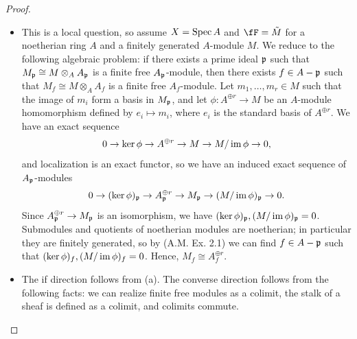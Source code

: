 \documentclass[a4paper]{article}
\begin{document}
\begin{enumerate} [label=\textbf{\arabic*.}, leftmargin=0em]
\begin{proof} $ $ \vspace{0pt}
    \begin{itemize}[leftmargin=0em]
        \item[(a)] This is a local question, so assume $X = \operatorname{Spec}{A}$ and $\fF = \tilde{M}$ for a noetherian ring $A$ and a finitely generated $A$-module $M$. We reduce to the following algebraic problem: if there exists a prime ideal $\mathfrak{p}$ such that $M_{\mathfrak{p}} \cong M \otimes_A A_{\mathfrak{p}}$ is a finite free $A_{\mathfrak{p}}$-module, then there exists $f \in A - \mathfrak{p}$ such that $M_{f} \cong M \otimes_A A_f$ is a finite free $A_f$-module. Let $m_1, \dots, m_r \in M$ such that the image of $m_i$ form a basis in $M_{\mathfrak{p}}$, and let $\phi : A^{\oplus r} \to M$ be an $A$-module homomorphism defined by $e_i \mapsto m_i$, where $e_i$ is the standard basis of $A^{\oplus r}$. We have an exact sequence
        \begin{equation*}
            0 \to \ker{\phi} \to A^{\oplus r} \to M \to M / \operatorname{im}{\phi} \to 0,
        \end{equation*}
        and localization is an exact functor, so we have an induced exact sequence of $A_{\mathfrak{p}}$-modules
        \begin{equation*}
            0 \to (\ker{\phi})_{\mathfrak{p}} \to A_{\mathfrak{p}}^{\oplus r} \to M_{\mathfrak{p}} \to (M / \operatorname{im}{\phi})_{\mathfrak{p}} \to 0.
        \end{equation*}
        Since $A_{\mathfrak{p}}^{\oplus r} \to M_{\mathfrak{p}}$ is an isomorphism, we have $(\ker{\phi})_{\mathfrak{p}}, (M / \operatorname{im}{\phi})_{\mathfrak{p}} = 0$. Submodules and quotients of noetherian modules are noetherian; in particular they are finitely generated, so by (A.M. Ex. 2.1) we can find $f \in A - \mathfrak{p}$ such that $(\ker{\phi})_f, (M / \operatorname{im}{\phi})_f = 0$. Hence, $M_f \cong A_f^{\oplus r}$.

        \item[(b)] The if direction follows from (a). The converse direction follows from the following facts: we can realize finite free modules as a colimit, the stalk of a sheaf is defined as a colimit, and colimits commute.


\end{itemize}
\end{proof}
\end{enumerate}
\end{document}
